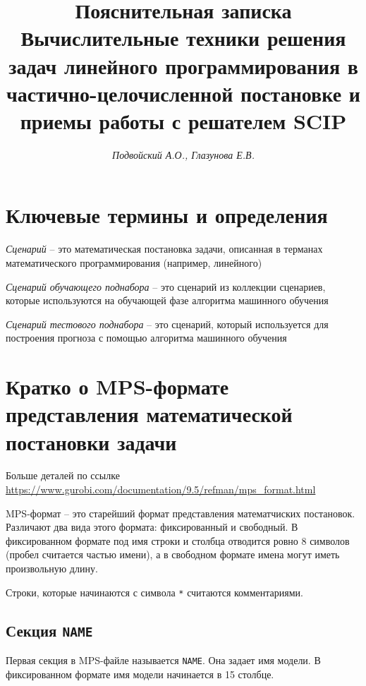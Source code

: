 \documentclass[%
	11pt,
	a4paper,
	utf8,
		]{article}
\begin{document}
\title{Пояснительная записка\\{\large Вычислительные техники решения задач линейного программирования в частично-целочисленной постановке и приемы работы с решателем SCIP}}

\author{\itshape Подвойский А.О., Глазунова Е.В.}


\date{}
\maketitle

\thispagestyle{fancy}



\tableofcontents

\section{Ключевые термины и определения}

\emph{Сценарий} -- это математическая постановка задачи, описанная в терманах математического программирования (например, линейного)

\emph{Сценарий обучающего поднабора} -- это сценарий из коллекции сценариев, которые используются на {обучающей фазе} алгоритма машинного обучения

\emph{Сценарий тестового поднабора} -- это сценарий, который используется {для построения прогноза} с помощью алгоритма машинного обучения

\section{Кратко о MPS-формате представления математической постановки задачи}

Больше деталей по ссылке \url{https://www.gurobi.com/documentation/9.5/refman/mps_format.html}

MPS-формат -- это старейший формат представления математчиских постановок. Различают два вида этого формата: фиксированный и свободный. В фиксированном формате под имя строки и столбца отводится ровно 8 символов (пробел считается частью имени), а в свободном формате имена могут иметь произвольную длину.

Строки, которые начинаются с символа \verb|*| считаются комментариями.

\subsection{Секция \texttt{NAME}}
Первая секция в MPS-файле называется \verb|NAME|. Она задает имя модели. В фиксированном формате имя модели начинается в 15 столбце.
\end{document}
